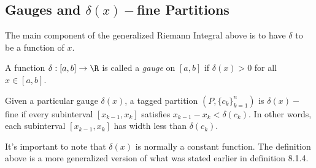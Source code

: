 \subsection{Gauges and \( \delta(x)- \)fine Partitions}

The main component of the generalized Riemann Integral above is to have \( \delta  \) to be a function of \( x  \). 

\begin{tcolorbox}
\begin{defn}
    A function \( \delta: [a,b] \to \R  \) is called a \textit{gauge} on \( [a,b]  \) if \( \delta(x) > 0  \) for all \( x \in [a,b]  \).
\end{defn}
\end{tcolorbox}

\begin{tcolorbox}
\begin{defn}
    Given a particular gauge \( \delta (x)  \), a tagged partition \( (P, \{ c_{k }  \}_{k=1}^{n} ) \) is \( \delta(x)- \)fine if every subinterval \( [x_{k-1}, x_{k }] \) satisfies \( x_{k-1} - x_{k } < \delta(c_{k})  \). In other words, each subinterval \( [x_{k-1}, x_{k} ] \) has width less than \( \delta(c_{k }) \). 
\end{defn}
\end{tcolorbox}

It's important to note that \( \delta(x)  \) is normally a constant function. The definition above is a more generalized version of what was stated earlier in definition 8.1.4. 

